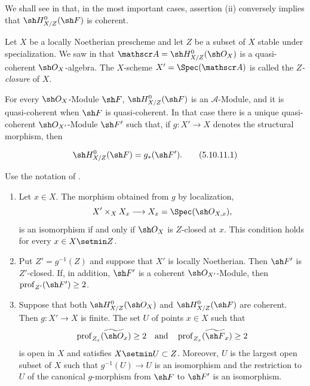 We shall see in  that, in the most important
cases, assertion {\rm(ii)} conversely implies that
$\sh H^0_{X/Z}(\sh F)$ is coherent.

\begin{env}[5.10.11]
\label{IV.5.10.11}
Let $X$ be a locally Noetherian prescheme and let $Z$ be a subset
of $X$ stable under specialization.  We saw in 
that $\mathscr A=\sh H^0_{X/Z}(\sh O_X)$
is a quasi-coherent $\sh O_X$-algebra.  The $X$-scheme $X'=\Spec(\mathscr A)$
 is called the \emph{$Z$-closure} of $X$.

For every $\sh O_X$-Module $\sh F$,
$\sh H^0_{X/Z}(\sh F)$ is an $\mathscr A$-Module, and it is
quasi-coherent when $\sh F$ is quasi-coherent.  In that case there
is a unique quasi-coherent $\sh O_{X'}$-Module $\sh F'$ such that,
if $g:X'\to X$ denotes the structural morphism, then
\end{env}

\begin{equation}
\label{IV.5.10.11.1}
  \sh H^0_{X/Z}(\sh F)=g_*(\sh F').
\tag{5.10.11.1}
\end{equation}

\begin{proposition}[5.10.12]
\label{IV.5.10.12}
Use the notation of .
\begin{enumerate}[{\rm(i)}]
  \item Let $x\in X$.  The morphism obtained from $g$ by
  localization,
  \[
    X'\times_X X_x\longrightarrow
    X_x=\Spec(\sh O_{X,x}),
  \]
  is an isomorphism if and only if $\sh O_X$ is $Z$-closed at
  $x$.  This condition holds for every $x\in X\setmin Z$.

  \item Put $Z'=g^{-1}(Z)$ and suppose that $X'$ is locally
  Noetherian.  Then $\sh F'$ is $Z'$-closed.  If, in addition,
  $\sh F'$ is a coherent $\sh O_{X'}$-Module, then $\operatorname{prof}_{Z'}(\sh F')\geq2$.

  \item Suppose that both
  $\sh H^0_{X/Z}(\sh O_X)$ and
  $\sh H^0_{X/Z}(\sh F)$ are coherent.  Then
  $g:X'\to X$ is finite.  The set $U$ of points $x\in X$ such
  that
  \[
    \operatorname{prof}_{Z_x}(\widetilde{\sh O}_x)\geq2
    \quad\text{and}\quad
    \operatorname{prof}_{Z_x}(\widetilde{\sh F}_x)\geq2
  \]
  is open in $X$ and satisfies $X\setmin U\subset Z$.  Moreover, $U$ is
  the largest open subset of $X$ such that
  $g^{-1}(U)\to U$ is an isomorphism and the restriction to $U$
  of the canonical $g$-morphism from $\sh F$ to $\sh F'$ is an
  isomorphism.
\end{enumerate}
\end{proposition}

